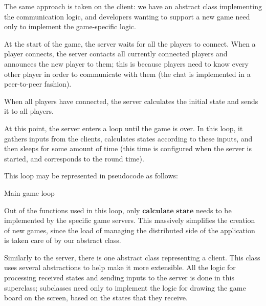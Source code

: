 \documentclass[times, 10pt,twocolumn]{article}
\begin{document}
The same approach is taken on the client: we have an abstract class implementing
the communication logic, and developers wanting to support a new game need only
to implement the game-specific logic.


At the start of the game, the server waits for all the players
to connect. When a player connects, the server contacts all
currently connected players and announces the new player to them;
this is because players need to know every other player in order
to communicate with them (the chat is implemented in a peer-to-peer
fashion).

When all players have connected, the server calculates the initial
state and sends it to all players.

At this point, the server enters a loop until the game is over. In this
loop, it gathers inputs from the clients, calculates states according to
these inputs, and then sleeps for some amount of time (this time is configured
when the server is started, and corresponds to the round time).

This loop may be represented in pseudocode as follows:

\begin{algorithm}[h]

    \caption{Main game loop}
\end{algorithm}

Out of the functions used in this loop, only \(\textbf{calculate\_state}\) needs
to be implemented by the specific game servers. This massively simplifies
the creation of new games, since the load of managing the distributed side
of the application is taken care of by our abstract class.


Similarly to the server, there is one abstract class representing a client.
This class uses several abstractions to help make it more extensible. All
the logic for processing received states and sending inputs to the server is
done in this superclass; subclasses need only to implement the logic for
drawing the game board on the screen, based on the states that they receive.
\end{document}

